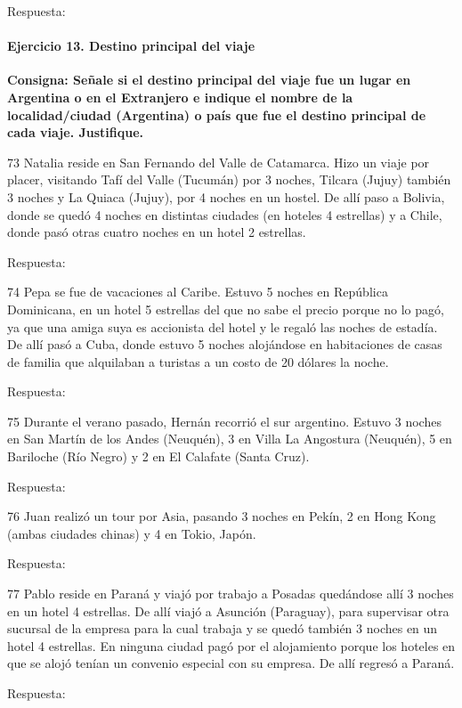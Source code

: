 \documentclass[
  openany]{book}
\begin{document}
Respuesta:

\hypertarget{ejercicio-13.-destino-principal-del-viaje}{%
\paragraph{Ejercicio 13. Destino principal del viaje}\label{ejercicio-13.-destino-principal-del-viaje}}

\textbf{Consigna: Señale si el destino principal del viaje fue un lugar en Argentina o en el Extranjero e indique el nombre de la localidad/ciudad (Argentina) o país que fue el destino principal de cada viaje. Justifique.}

73 Natalia reside en San Fernando del Valle de Catamarca. Hizo un viaje por placer, visitando Tafí del Valle (Tucumán) por 3 noches, Tilcara (Jujuy) también 3 noches y La Quiaca (Jujuy), por 4 noches en un hostel. De allí paso a Bolivia, donde se quedó 4 noches en distintas ciudades (en hoteles 4 estrellas) y a Chile, donde pasó otras cuatro noches en un hotel 2 estrellas.

Respuesta:

74 Pepa se fue de vacaciones al Caribe. Estuvo 5 noches en República Dominicana, en un hotel 5 estrellas del que no sabe el precio porque no lo pagó, ya que una amiga suya es accionista del hotel y le regaló las noches de estadía. De allí pasó a Cuba, donde estuvo 5 noches alojándose en habitaciones de casas de familia que alquilaban a turistas a un costo de 20 dólares la noche.

Respuesta:

75 Durante el verano pasado, Hernán recorrió el sur argentino. Estuvo 3 noches en San Martín de los Andes (Neuquén), 3 en Villa La Angostura (Neuquén), 5 en Bariloche (Río Negro) y 2 en El Calafate (Santa Cruz).

Respuesta:

76 Juan realizó un tour por Asia, pasando 3 noches en Pekín, 2 en Hong Kong (ambas ciudades chinas) y 4 en Tokio, Japón.

Respuesta:

77 Pablo reside en Paraná y viajó por trabajo a Posadas quedándose allí 3 noches en un hotel 4 estrellas. De allí viajó a Asunción (Paraguay), para supervisar otra sucursal de la empresa para la cual trabaja y se quedó también 3 noches en un hotel 4 estrellas. En ninguna ciudad pagó por el alojamiento porque los hoteles en que se alojó tenían un convenio especial con su empresa. De allí regresó a Paraná.

Respuesta:
\end{document}
